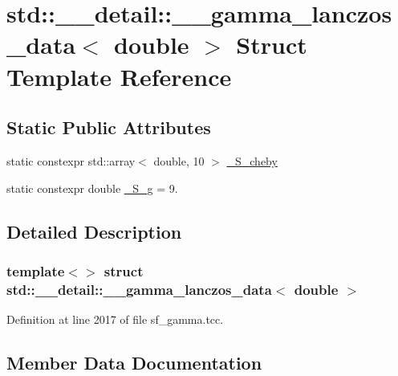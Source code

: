 \hypertarget{structstd_1_1____detail_1_1____gamma__lanczos__data_3_01double_01_4}{}\section{std\+:\+:\+\_\+\+\_\+detail\+:\+:\+\_\+\+\_\+gamma\+\_\+lanczos\+\_\+data$<$ double $>$ Struct Template Reference}
\label{structstd_1_1____detail_1_1____gamma__lanczos__data_3_01double_01_4}
\subsection*{Static Public Attributes}
\begin{DoxyCompactItemize}
\item 
static constexpr std\+::array$<$ double, 10 $>$ \hyperlink{structstd_1_1____detail_1_1____gamma__lanczos__data_3_01double_01_4_a315868c6a789a5e7455f7eb4d8d86115}{\+\_\+\+S\+\_\+cheby}
\item 
static constexpr double \hyperlink{structstd_1_1____detail_1_1____gamma__lanczos__data_3_01double_01_4_ab7959ed84fcc00db67df8b167165513d}{\+\_\+\+S\+\_\+g} = 9.
\end{DoxyCompactItemize}


\subsection{Detailed Description}
\subsubsection*{template$<$$>$\newline
struct std\+::\+\_\+\+\_\+detail\+::\+\_\+\+\_\+gamma\+\_\+lanczos\+\_\+data$<$ double $>$}



Definition at line 2017 of file sf\+\_\+gamma.\+tcc.



\subsection{Member Data Documentation}
\mbox{\label{structstd_1_1____detail_1_1____gamma__lanczos__data_3_01double_01_4_a315868c6a789a5e7455f7eb4d8d86115}} 

